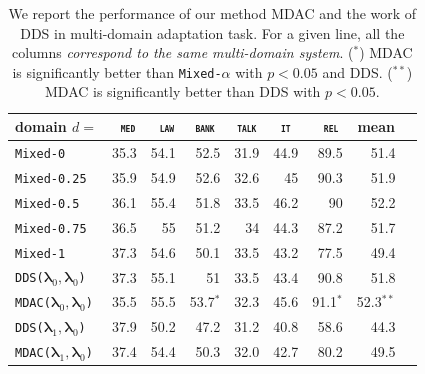 \documentclass[11pt]{article}
\newcommand{\domain}[1]{\texttt{\textsc{#1}}}
\newcommand{\system}[1]{\texttt{{#1}}}
\newcommand{\vlambda}{\ensuremath{\boldsymbol\lambda}\xspace} %
\begin{document}
\begin{table}[htbp]
  \centering \small
  \begin{tabular}{|l|*8{r|}} \hline
    domain \hfill $d=$ & \multicolumn{1}{c|}{\domain{ med}} & \multicolumn{1}{c|}{\domain{ law}} & \multicolumn{1}{c|}{\domain{bank}} & \multicolumn{1}{c|}{\domain{talk}} & \multicolumn{1}{c|}{\domain{ it }} & \multicolumn{1}{c|}{\domain{ rel}} & \multicolumn{1}{c|}{mean} \\ \hline \hline
    \system{Mixed-0}      & 35.3 & 54.1 & 52.5 & 31.9 & 44.9 & 89.5& 51.4 \\
    \system{Mixed-0.25} & 35.9 & 54.9 & 52.6 & 32.6 & 45 & 90.3& 51.9 \\
    \system{Mixed-0.5}   & 36.1 & 55.4 & 51.8 & 33.5 & 46.2 & 90 & 52.2 \\
    \system{Mixed-0.75} & 36.5 & 55 & 51.2 & 34 & 44.3 & 87.2& 51.7 \\
    \system{Mixed-1}     & 37.3  & 54.6 & 50.1 & 33.5 & 43.2 & 77.5& 49.4 \\
    \hline \hline
    \system{DDS($\vlambda_0, \vlambda_0$)} &37.3&55.1&51&33.5&43.4&90.8&51.8\\ 
    \system{MDAC($\vlambda_0, \vlambda_0$)}&35.5&55.5&53.7$^*$&32.3&45.6&91.1$^*$&52.3$^{**}$\\ 
    \hline \hline
    \system{DDS($\vlambda_1, \vlambda_0$)} &37.9&50.2&47.2&31.2&40.8&58.6&44.3\\
    \system{MDAC($\vlambda_1, \vlambda_0$)}&37.4&54.4&50.3&32.0&42.7&80.2&49.5\\
    \hline
  \end{tabular}
  \caption{We report the performance of our method MDAC and the work of \citet{Wang20balancing} DDS in multi-domain adaptation task. For a given line, all the columns \emph{correspond to the same multi-domain system}. ($^*$) MDAC is significantly better than \system{Mixed-$\alpha$} with $p<0.05$ and DDS. ($^{**}$) MDAC is significantly better than DDS with $p<0.05$.}
  \label{tab:multi-da}
\end{table}
\end{document}
